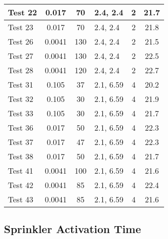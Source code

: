 \begin{table}[!ht]
\begin{center}
\begin{tabular}{|l|c|c|l|c|c|}
Test 22    &  0.017            &  70                 &  2.4, 2.4   &  2              &  21.7                  \\ \hline
Test 23    &  0.017            &  70                 &  2.4, 2.4   &  2              &  21.8                  \\ \hline
Test 26    &  0.0041           &  130                &  2.4, 2.4   &  2              &  21.5                  \\ \hline
Test 27    &  0.0041           &  130                &  2.4, 2.4   &  2              &  22.5                  \\ \hline
Test 28    &  0.0041           &  120                &  2.4, 2.4   &  2              &  22.7                  \\ \hline
Test 31    &  0.105            &  37                 &  2.1, 6.59  &  4              &  20.2                  \\ \hline
Test 32    &  0.105            &  30                 &  2.1, 6.59  &  4              &  21.9                  \\ \hline
Test 33    &  0.105            &  30                 &  2.1, 6.59  &  4              &  21.7                  \\ \hline
Test 36    &  0.017            &  50                 &  2.1, 6.59  &  4              &  22.3                  \\ \hline
Test 37    &  0.017            &  47                 &  2.1, 6.59  &  4              &  22.3                  \\ \hline
Test 38    &  0.017            &  50                 &  2.1, 6.59  &  4              &  21.7                  \\ \hline
Test 41    &  0.0041           &  100                &  2.1, 6.59  &  4              &  21.6                  \\ \hline
Test 42    &  0.0041           &  85                 &  2.1, 6.59  &  4              &  22.4                  \\ \hline
Test 43    &  0.0041           &  85                 &  2.1, 6.59  &  4              &  21.6                  \\ \hline
\end{tabular}
\end{center}
\end{table}


\clearpage


\subsection*{Sprinkler Activation Time~\cite{SFPE:Alpert}}

